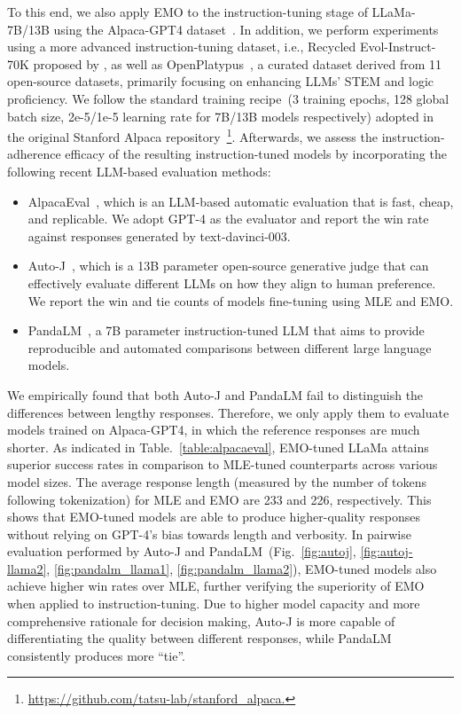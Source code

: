 To this end, we also apply EMO to the instruction-tuning stage of LLaMa-7B/13B using the Alpaca-GPT4 dataset~\citep{peng2023instruction}. In addition, we perform experiments using a more advanced instruction-tuning dataset, i.e., Recycled Evol-Instruct-70K proposed by \cite{li2023reflectiontuning}, as well as OpenPlatypus~\citep{platypus2023}, a curated dataset derived from 11 open-source datasets, primarily focusing on enhancing LLMs' STEM and logic proficiency. We follow the standard training recipe~(3 training epochs, 128 global batch size, 2e-5/1e-5 learning rate for 7B/13B models respectively) adopted in the original Stanford Alpaca repository~\footnote{\url{https://github.com/tatsu-lab/stanford_alpaca.}}. Afterwards, we assess the instruction-adherence efficacy of the resulting instruction-tuned models by incorporating the following recent LLM-based evaluation methods:
\begin{itemize}
    \item AlpacaEval~\citep{alpaca_eval}, which is an LLM-based automatic evaluation that is fast, cheap, and replicable. We adopt GPT-4 as the evaluator and report the win rate against responses generated by text-davinci-003.
    \item Auto-J~\citep{li2023generative}, which is a 13B parameter open-source generative judge that can effectively evaluate different LLMs on how they align to human preference. We report the win and tie counts of models fine-tuning using MLE and EMO.
    \item PandaLM~\citep{pandalm2023}, a 7B parameter instruction-tuned LLM that aims to provide reproducible and automated comparisons between different large language models.
\end{itemize}
We empirically found that both Auto-J and PandaLM fail to distinguish the differences between lengthy responses. Therefore, we only apply them to evaluate models trained on Alpaca-GPT4, in which the reference responses are much shorter. As indicated in Table.~\ref{table:alpacaeval}, EMO-tuned LLaMa attains superior success rates in comparison to MLE-tuned counterparts across various model sizes. The average response length (measured by the number of tokens following tokenization) for MLE and EMO are 233 and 226, respectively. This shows that EMO-tuned models are able to produce higher-quality responses without relying on GPT-4's bias towards length and verbosity. In pairwise evaluation performed by Auto-J and PandaLM~(Fig.~\ref{fig:autoj}, \ref{fig:autoj-llama2}, \ref{fig:pandalm_llama1}, \ref{fig:pandalm_llama2}), EMO-tuned models also achieve higher win rates over MLE, further verifying the superiority of EMO when applied to instruction-tuning. Due to higher model capacity and more comprehensive rationale for decision making, Auto-J is more capable of differentiating the quality between different responses, while PandaLM consistently produces more ``tie''.

